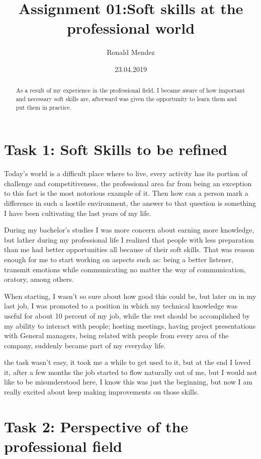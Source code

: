 \documentclass[a4paper, 12pt]{article}
\title{Assignment 01:Soft skills at the professional world }
\author{Ronald Mendez}
\date{23.04.2019}
\begin{document}
\maketitle
\begin{abstract}
    As a result of my experience in the professional field, I became aware of how important and necessary soft skills are, afterward was given the opportunity to learn them and put them in practice.
\end{abstract}
\section{Task 1: Soft Skills to be refined}
Today's world is a difficult place where to live, every activity has its portion of challenge and competitiveness, the professional area far from being an exception to this fact is the most notorious example of it. Then how can a person mark a difference in such a hostile environment, the answer to that question is something I have been cultivating the last years of my life.

During my bachelor's studies I was more concern about earning more knowledge, but lather during my professional life I realized that people with less preparation than me had better opportunities all because of their soft skills. That was reason enough for me to start working on aspects such as: being a better listener, transmit emotions while communicating no matter the way of communication, oratory, among others.

 When starting, I wasn't so sure about how good this could be, but later on in my last job, I was promoted to a position in which my technical knowledge was useful for about 10 percent of my job, while the rest should be accomplished by my ability to interact with people; hosting meetings, having project presentations with General managers, being related with people from every area of the company, suddenly became part of my everyday life.

the task wasn't easy, it took me a while to get used to it, but at the end I loved it, after a few months the job started to flow naturally out of me, but I would not like to be misunderstood here, I know this was just the beginning, but now I am really excited about keep making improvements on those skills.

\section{Task 2: Perspective of the professional field}
\end{document}
